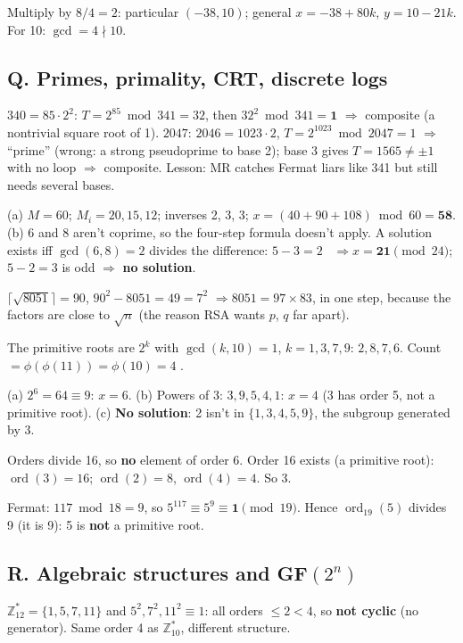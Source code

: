 \ans Multiply by $8/4 = 2$: particular $(-38, 10)$; general $x = -38 + 80k$, $y = 10 - 21k$. For 10: $\gcd = 4 \nmid 10$.

\subsection*{Q. Primes, primality, CRT, discrete logs}
\ans $340 = 85 \cdot 2^2$: $T = 2^{85} \bmod 341 = 32$, then $32^2 \bmod 341 = \mathbf{1}$ $\Rightarrow$ composite (a nontrivial square root of 1). $2047$: $2046 = 1023 \cdot 2$, $T = 2^{1023} \bmod 2047 = 1$ $\Rightarrow$ ``prime'' (wrong: a strong pseudoprime to base 2); base 3 gives $T = 1565 \ne \pm1$ with no loop $\Rightarrow$ composite. Lesson: MR catches Fermat liars like 341 but still needs several bases.

\ans (a) $M = 60$; $M_i = 20, 15, 12$; inverses 2, 3, 3; $x = (40 + 90 + 108) \bmod 60 = \mathbf{58}$. (b) 6 and 8 aren't coprime, so the four-step formula doesn't apply. A solution exists iff $\gcd(6, 8) = 2$ divides the difference: $5 - 3 = 2$ \checkmark\ $\Rightarrow x = \mathbf{21} \pmod{24}$; $5 - 2 = 3$ is odd $\Rightarrow$ \textbf{no solution}.

\ans $\lceil\sqrt{8051}\rceil = 90$, $90^2 - 8051 = 49 = 7^2$ $\Rightarrow 8051 = 97 \times 83$, in one step, because the factors are close to $\sqrt n$ (the reason RSA wants $p$, $q$ far apart).

\ans The primitive roots are $2^k$ with $\gcd(k, 10) = 1$, $k = 1, 3, 7, 9$: $2, 8, 7, 6$. Count $= \phi(\phi(11)) = \phi(10) = 4$ \checkmark.

\ans (a) $2^6 = 64 \equiv 9$: $x = 6$. (b) Powers of 3: $3, 9, 5, 4, 1$: $x = 4$ (3 has order 5, not a primitive root). (c) \textbf{No solution}: 2 isn't in $\{1, 3, 4, 5, 9\}$, the subgroup generated by 3.

\ans Orders divide 16, so \textbf{no} element of order 6. Order 16 exists (a primitive root): $\operatorname{ord}(3) = 16$; $\operatorname{ord}(2) = 8$, $\operatorname{ord}(4) = 4$. So 3.

\ans Fermat: $117 \bmod 18 = 9$, so $5^{117} \equiv 5^9 \equiv \mathbf{1} \pmod{19}$. Hence $\operatorname{ord}_{19}(5)$ divides 9 (it is 9): 5 is \textbf{not} a primitive root.

\subsection*{R. Algebraic structures and GF$(2^n)$}
\ans $\mathbb{Z}_{12}^* = \{1, 5, 7, 11\}$ and $5^2, 7^2, 11^2 \equiv 1$: all orders $\le 2 < 4$, so \textbf{not cyclic} (no generator). Same order 4 as $\mathbb{Z}_{10}^*$, different structure.

